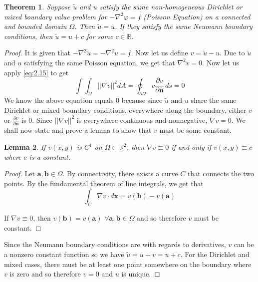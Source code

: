 \documentclass{article}
\newcommand{\R}{\mathbb{R}}
\newcommand{\pd}[2]{\frac{\partial #1}{\partial #2}}
\newcommand{\vb}[1]{\mathbf{ #1}}
\newcommand{\lap}{\nabla ^2}
\newcommand{\pull}{\! \! \!}
\newcommand{\dint}{\int \pull \int}
\newcommand{\un}{\mathbf{\hat{n}}}
\newtheorem{theorem}{Theorem}[section]
\newtheorem{lemma}[theorem]{Lemma}
\numberwithin{equation}{section}
\begin{document}
\begin{theorem}
    Suppose $\tilde{u}$ and $u$ satisfy the same non-homogeneous Dirichlet or mixed boundary value problem for $-\lap \varphi = f$ (Poisson Equation) on a connected and bounded domain $\Omega$. Then $\tilde{u}=u$. If they satisfy the same Neumann boundary conditions, then $\tilde{u} = u+c $ for some $c \in \R$.
\end{theorem}
\begin{proof}
    It is given that $-\lap \tilde{u}=-\lap u=f$. Now let us define $v=\tilde{u} -u$. Due to $\tilde{u}$ and $u$ satisfying the same Poisson equation, we get that $\lap v=0.$ Now let us apply \eqref{eq:2.15} to get 
    \begin{equation*}
        \dint_\Omega||\nabla v||^2dA = \oint_{\partial \Omega}v \pd{v}{\un}\,ds = 0
    \end{equation*}
    We know the above equation equals 0 because since $\tilde{u}$ and $u$ share the same Dirichlet or mixed boundary conditions, everywhere along the boundary, either $v$ or $\pd{v}{\vb{\hat{n}}}$ is 0. Since $||\nabla v||^2$ is everywhere continuous and nonnegative, $\nabla v=0$. We shall now state and prove a lemma to show that $v$ must be some constant.
    \begin{lemma}
        If $v(x,y)$ is $C^1$ on $\Omega \subset \R^2$, then $\nabla v \equiv0$ if and only if $v(x,y) \equiv c$ where $c$ is a constant.
    \end{lemma}
    \begin{proof}
        Let $\vb{a}, \vb{b} \in \Omega$. By connectivity, there exists a curve $C$ that connects the two points. By the fundamental theorem of line integrals, we get that 
        \begin{equation}
            \int_C \nabla v \cdot d\vb{x} = v(\vb{b})-v(\vb{a})
        \end{equation}
            
        If $\nabla v \equiv 0 $, then $v(\vb{b}) = v(\vb{a}) \hspace{4pt} \forall \vb{a},\vb{b} \in \Omega$ and so therefore $v$ must be constant.
    \end{proof}
    Since the Neumann boundary conditions are with regards to derivatives, $v$ can be a nonzero constant function so we have $\tilde{u} = u+v = u+c$. For the Dirichlet and mixed cases, there must be at least one point somewhere on the boundary where $v$ is zero and so therefore $v =0$ and $u$ is unique.
\end{proof}
\end{document}
